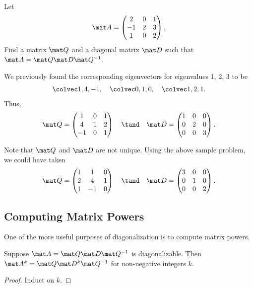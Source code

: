 \begin{sample}
    Let \[\mat A = \begin{pmatrix}2 & 0 & 1 \\ -1 & 2 & 3 \\ 1 & 0 & 2\end{pmatrix}.\] Find a matrix $\mat Q$ and a diagonal matrix $\mat D$ such that $\mat A = \mat Q \mat D \mat Q^{-1}$.
\end{sample}
\begin{sampans}
    We previously found the corresponding eigenvectors for eigenvalues 1, 2, 3 to be \[\cveciii14{-1}, \quad \cveciii010, \quad \cveciii121.\] Thus, \[\mat Q = \begin{pmatrix}1 & 0 & 1 \\ 4 & 1 & 2 \\ -1 & 0 & 1\end{pmatrix} \quad \tand \quad \mat D = \begin{pmatrix}1 & 0 & 0 \\ 0 & 2 & 0 \\ 0 & 0 & 3 \end{pmatrix}.\]
\end{sampans}

Note that $\mat Q$ and $\mat D$ are not unique. Using the above sample problem, we could have taken \[\mat Q = \begin{pmatrix}1 & 1 & 0 \\ 2 & 4 & 1 \\ 1 & -1 & 0\end{pmatrix} \quad \tand \quad \mat D = \begin{pmatrix}3 & 0 & 0 \\ 0 & 1 & 0 \\ 0 & 0 & 2\end{pmatrix}.\]

\subsection{Computing Matrix Powers}

One of the more useful purposes of diagonalization is to compute matrix powers.

\begin{proposition}
    Suppose $\mat A = \mat Q \mat D \mat Q^{-1}$ is diagonalizable. Then $\mat A^k = \mat Q \mat D^k \mat Q^{-1}$ for non-negative integers $k$.
\end{proposition}
\begin{proof}
    Induct on $k$.
\end{proof}

